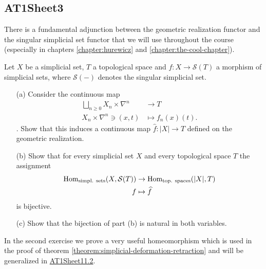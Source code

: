 \begin{sketch}
\end{sketch}

\subsection{AT1Sheet3}

There is a fundamental adjunction between the geometric realization functor and the singular simplicial set functor that we will use throughout the course (especially in chapters \ref{chapter:hurewicz} and \ref{chapter:the-cool-chapter}).

\label{exercise:AT1Sheet3.1}
Let $X$ be a simplicial set, $T$ a topological space and $f : X\to \mathcal{S}(T)$ a
morphism of simplicial sets, where $\mathcal{S}(-)$ denotes the singular simplicial set.
\begin{itemize}
    \item[(a)] Consider the continuous map
    \begin{align*}
        \bigsqcup_{n\ge0} X_n\times\nabla^n &\to T\\
        X_n\times\nabla^n\ni (x,t) &\mapsto f_n(x)(t).
    \end{align*}
.    Show that this induces a continuous map $\widehat{f} : |X| \to T$ defined on the geometric realization.
    
    \item[(b)] Show that for every simplicial set $X$ and every topological space $T$ the assignment
    \begin{align*}
    \operatorname{Hom}_{\text{simpl. sets}}(X,\mathcal{S}(T)) &\to \operatorname{Hom}_{\text{top. spaces}}(|X|,T)\\
    f &\mapsto \widehat{f}
    \end{align*}
is bijective.
    
    \item[(c)] Show that the bijection of part (b) is natural in both variables.
\end{itemize}

\begin{sketch}
\end{sketch}

In the second exercise we prove a very useful homeomorphism which is used in the proof of theorem \ref{theorem:simplicial-deformation-retraction} and will be generalized in \hyperref[exercise:AT1Sheet11.2]{AT1Sheet11.2}.

